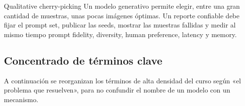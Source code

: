 \documentclass[a4paper]{article}
\begin{document}
\begin{warningbox}{Qualitative cherry-picking}
Un modelo generativo permite elegir, entre una gran cantidad de muestras, unas pocas imágenes óptimas. Un reporte confiable debe fijar el prompt set, publicar las seeds, mostrar las muestras fallidas y medir al mismo tiempo prompt fidelity, diversity, human preference, latency y memory.
\end{warningbox}

\subsection{Concentrado de términos clave}

A continuación se reorganizan los términos de alta densidad del curso según «el problema que resuelven», para no confundir el nombre de un modelo con un mecanismo.
\end{document}
